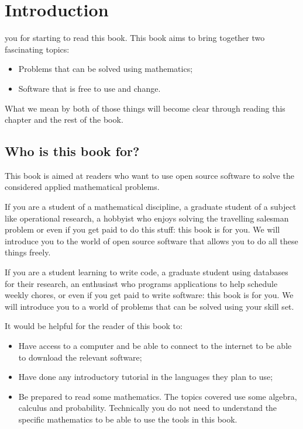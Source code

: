 \chapter[Introduction]{Introduction}

 you for starting to read this book. This book aims to
bring together two fascinating topics:

\begin{itemize}
\item
  Problems that can be solved using mathematics;
\item
  Software that is free to use and change.
\end{itemize}

What we mean by both of those things will become clear through reading
this chapter and the rest of the book.

\section{Who is this book for?}\label{sec:who-is-this-book-for}

This book is aimed at readers who want to use open source software to solve the
considered applied mathematical problems.

If you are a student of a mathematical discipline, a graduate student of
a subject like operational research, a hobbyist who enjoys solving the
travelling salesman problem or even if you get paid to do this stuff:
this book is for you. We will introduce you to the world of open source
software that allows you to do all these things freely.

If you are a student learning to write code, a graduate student using
databases for their research, an enthusiast who programs applications
to help schedule weekly chores, or even if you get paid to
write software: this book is for you. We will introduce you to a world
of problems that can be solved using your skill set.

It would be helpful for the reader of this book to:

\begin{itemize}
\item
  Have access to a computer and be able to connect to the internet
  to be able to download the relevant software;
\item
  Have done any introductory tutorial in the languages they plan to use;
\item
  Be prepared to read some mathematics.
  The topics covered use some algebra, calculus and probability.
  Technically you do not need to
  understand the specific mathematics to be able to use the tools in this book.
\end{itemize}

